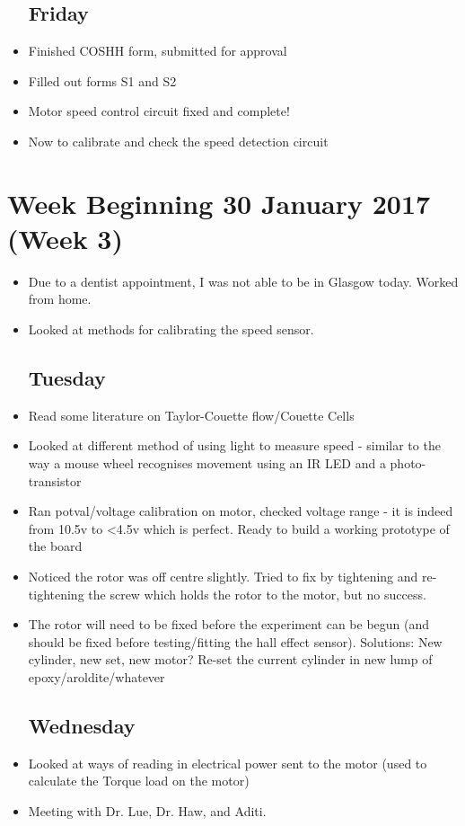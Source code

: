 \documentclass[a4]{report}
\begin{document}
\begin{itemize}
		\subsection*{Friday}
		\item Finished COSHH form, submitted for approval
		\item Filled out forms S1 and S2
		\item Motor speed control circuit fixed and complete!
		\item Now to calibrate and check the speed detection circuit
	\end{itemize}
	\newpage
	\section{Week Beginning 30 January 2017 (Week 3)}
	\begin{itemize}
		\subsection*{Monday}
		\item Due to a dentist appointment, I was not able to be in Glasgow today. Worked from home.
		\item Looked at methods for calibrating the speed sensor.
		\subsection*{Tuesday}
		\item Read some literature on Taylor-Couette flow/Couette Cells
		\item Looked at different method of using light to measure speed - similar to the way a mouse wheel recognises movement using an IR LED and a photo-transistor
		\item Ran potval/voltage calibration on motor, checked voltage range - it is indeed from 10.5v to <4.5v which is perfect. Ready to build a working prototype of the board
		\item Noticed the rotor was off centre slightly. Tried to fix by tightening and re-tightening the screw which holds the rotor to the motor, but no success.
		\item The rotor will need to be fixed before the experiment can be begun (and should be fixed before testing/fitting the hall effect sensor). Solutions:
		\subitem New cylinder, new set, new motor?
		\subitem Re-set the current cylinder in new lump of epoxy/aroldite/whatever
		\subsection*{Wednesday}
		\item Looked at ways of reading in electrical power sent to the motor (used to calculate the Torque load on the motor)
		\item Meeting with Dr. Lue, Dr. Haw, and Aditi.

\end{itemize}
\end{document}
